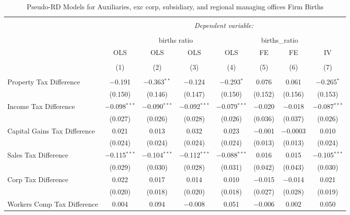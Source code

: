 
\begin{table}[!htbp] \centering 
  \caption{Pseudo-RD Models for  Auxiliaries, exc corp, subsidiary, and regional managing offices Firm Births} 
  \label{} 
\begin{tabular}{@{\extracolsep{5pt}}lccccccc} 
\\[-1.8ex]\hline 
\hline \\[-1.8ex] 
 & \multicolumn{7}{c}{\textit{Dependent variable:}} \\ 
\cline{2-8} 
\\[-1.8ex] & \multicolumn{4}{c}{births ratio} & \multicolumn{2}{c}{births\_ratio} &   \\ 
 & OLS & OLS & OLS & OLS & FE & FE & IV \\ 
\\[-1.8ex] & (1) & (2) & (3) & (4) & (5) & (6) & (7)\\ 
\hline \\[-1.8ex] 
 Property Tax Difference & $-$0.191 & $-$0.363$^{**}$ & $-$0.124 & $-$0.293$^{*}$ & 0.076 & 0.061 & $-$0.265$^{*}$ \\ 
  & (0.150) & (0.146) & (0.147) & (0.150) & (0.152) & (0.156) & (0.153) \\ 
  Income Tax Difference & $-$0.098$^{***}$ & $-$0.090$^{***}$ & $-$0.092$^{***}$ & $-$0.079$^{***}$ & $-$0.020 & $-$0.018 & $-$0.087$^{***}$ \\ 
  & (0.027) & (0.026) & (0.028) & (0.026) & (0.036) & (0.037) & (0.026) \\ 
  Capital Gains Tax Difference & 0.021 & 0.013 & 0.032 & 0.023 & $-$0.001 & $-$0.0003 & 0.010 \\ 
  & (0.024) & (0.024) & (0.024) & (0.024) & (0.013) & (0.013) & (0.024) \\ 
  Sales Tax Difference & $-$0.115$^{***}$ & $-$0.104$^{***}$ & $-$0.112$^{***}$ & $-$0.088$^{***}$ & 0.016 & 0.015 & $-$0.105$^{***}$ \\ 
  & (0.029) & (0.030) & (0.028) & (0.031) & (0.042) & (0.043) & (0.030) \\ 
  Corp Tax Difference & 0.022 & 0.017 & 0.014 & 0.010 & $-$0.015 & $-$0.014 & 0.021 \\ 
  & (0.020) & (0.018) & (0.020) & (0.018) & (0.027) & (0.028) & (0.019) \\ 
  Workers Comp Tax Difference & 0.004 & 0.094 & $-$0.008 & 0.051 & $-$0.006 & 0.002 & 0.050 \\ 

\end{tabular}
\end{table}
